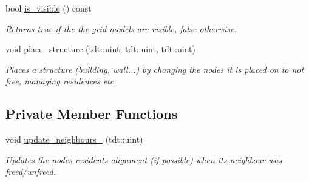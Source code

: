\begin{DoxyCompactItemize}
bool \hyperlink{class_grid_system_ae2e8bd4a285fe72fe10c93a60f5bfa88}{is\+\_\+visible} () const 
\begin{DoxyCompactList}\small\item\em Returns true if the the grid models are visible, false otherwise. \end{DoxyCompactList}\item 
void \hyperlink{class_grid_system_a7d222c190fbb33b534459664c5c20e97}{place\+\_\+structure} (tdt\+::uint, tdt\+::uint, tdt\+::uint)
\begin{DoxyCompactList}\small\item\em Places a structure (building, wall...) by changing the nodes it is placed on to not free, managing residences etc. \end{DoxyCompactList}\end{DoxyCompactItemize}
\subsection*{Private Member Functions}
\begin{DoxyCompactItemize}
\item 
void \hyperlink{class_grid_system_af9dce4987f42acc6797026fd9393f3c3}{update\+\_\+neighbours\+\_\+} (tdt\+::uint)
\begin{DoxyCompactList}\small\item\em Updates the nodes resident\textquotesingle{}s alignment (if possible) when it\textquotesingle{}s neighbour was freed/unfreed. \end{DoxyCompactList}\end{DoxyCompactItemize}
